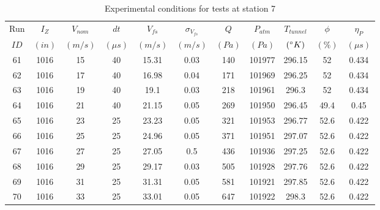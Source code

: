 \begin{table}[H]
\begin{center}
\begin{tabular}{|ccccccccccc|}
	\hline
	Run & $I_Z$ & $V_{nom}$ & $dt$ & $V_{fs}$ & $\sigma_{V_{fs}}$ & $Q$ & $P_{atm}$ & $T_{tunnel}$ & $\phi$ & $\eta_P$\\
	$ID$ & $(in)$ & $(m/s)$ & $(\mu s)$ & $(m/s)$ & $(m/s)$ & $(Pa)$ & $(Pa)$ & $(\degree K)$ & $(\%)$ & $(\mu s)$\\
	\hline
	61 & 1016 & 15 & 40 & 15.31 & 0.03 & 140 & 101977 & 296.15 & 52 & 0.434\\
	62 & 1016 & 17 & 40 & 16.98 & 0.04 & 171 & 101969 & 296.25 & 52 & 0.434\\
	63 & 1016 & 19 & 40 & 19.1 & 0.03 & 218 & 101961 & 296.3 & 52 & 0.434\\
	64 & 1016 & 21 & 40 & 21.15 & 0.05 & 269 & 101950 & 296.45 & 49.4 & 0.45\\
	65 & 1016 & 23 & 25 & 23.23 & 0.05 & 321 & 101953 & 296.77 & 52.6 & 0.422\\
	66 & 1016 & 25 & 25 & 24.96 & 0.05 & 371 & 101951 & 297.07 & 52.6 & 0.422\\
	67 & 1016 & 27 & 25 & 27.05 & 0.5 & 436 & 101936 & 297.25 & 52.6 & 0.422\\
	68 & 1016 & 29 & 25 & 29.17 & 0.03 & 505 & 101928 & 297.76 & 52.6 & 0.422\\
	69 & 1016 & 31 & 25 & 31.31 & 0.05 & 581 & 101921 & 297.85 & 52.6 & 0.422\\
	70 & 1016 & 33 & 25 & 33.01 & 0.05 & 647 & 101922 & 298.3 & 52.6 & 0.422\\
	\hline
\end{tabular}
\caption{Experimental conditions for tests at station 7}
\label{table:station_7_measurements}
\end{center}
\end{table}
